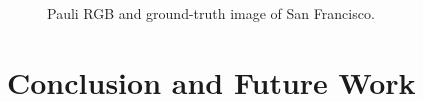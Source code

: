 \documentclass[11pt, a4paper, onecolumn, oneside]{article}
\begin{document}
\begin{figure}
\caption{Pauli RGB and ground-truth image of San Francisco.}
\label{fig:eleven}
\end{figure}

\section{Conclusion and Future Work}
\end{document}
